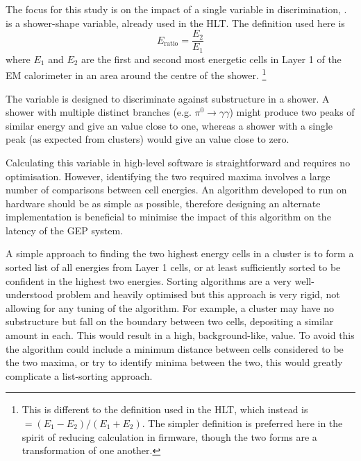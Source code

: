 
The focus for this study is on the impact of a single variable in \egamma
discrimination, \eratio.
\eratio is a shower-shape variable, already used in the \ac{HLT}. The definition used here is
%
\begin{equation}
  \label{eqn:trig-eratio-algorithm-eratio}
  E_\text{ratio} = \frac{E_2}{E_1} %
\end{equation}
%
where $E_1$ and $E_2$ are the first and second most energetic cells in Layer 1
of the \ac{EM} calorimeter in an area around the centre of the shower.%
\footnote{
  This is different to the definition used in the \ac{HLT}, which instead is
  \eratio$ = (E_1 - E_2)/(E_1+E_2)$. The simpler definition is preferred here in
  the spirit of reducing calculation in firmware, though the two forms are a
  transformation of one another.
}

The \eratio variable is designed to discriminate against substructure in a
shower.  A shower with multiple distinct branches (e.g. $\pi^0\to\gamma\gamma$)
might produce two peaks of similar energy and give an \eratio value close to
one, whereas a shower with a single peak (as expected from \egamma clusters)
would give an \eratio value close to zero.

Calculating this variable in high-level software is straightforward and requires
no optimisation. However, identifying the two required maxima involves a large
number of comparisons between cell energies. An algorithm developed to run on
hardware should be as simple as possible, therefore designing an alternate
implementation is beneficial to minimise the impact of this algorithm on the
latency of the \ac{GEP} system.

A simple approach to finding the two highest energy cells in a cluster is to
form a sorted list of all energies from Layer 1 cells, or at least sufficiently
sorted to be confident in the highest two energies. Sorting algorithms are a
very well-understood problem and heavily optimised but this approach is very
rigid, not allowing for any tuning of the algorithm. For example, a cluster may
have no substructure but fall on the boundary between two cells, depositing a
similar amount in each. This would result in a high, background-like, \eratio
value. To avoid this the algorithm could include a minimum distance between
cells considered to be the two maxima, or try to identify minima between the
two, this would greatly complicate a list-sorting approach.

